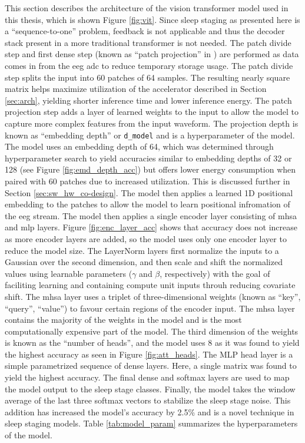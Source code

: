 This section describes the architecture of the vision transformer model used in this thesis, which is shown Figure \ref{fig:vit}. Since sleep staging as presented
here is a ``sequence-to-one'' problem, feedback is not applicable and thus the decoder stack present in a more traditional transformer is not needed. The patch divide step and
first dense step (known as ``patch projection'' in \cite{dosovitskiy2010image}) are performed as data comes in from the \ac{eeg} \ac{adc} to reduce temporary storage usage. The 
patch divide step splits the input into 60 patches of 64 samples. The resulting nearly square matrix helps maximize utilization of the accelerator described in Section \ref{sec:arch},
yielding shorter inference time and lower inference energy. The patch projection step adds a layer of learned weights to the input to allow the model to capture more complex features
from the input waveform. The projection depth is known as ``embedding depth'' or \texttt{d\_model} and is a hyperparameter of the model. The model uses an embedding depth of 64,
which was determined through hyperparameter search to yield accuracies similar to embedding depths of 32 or 128 (see Figure \ref{fig:emd_depth_acc}) but offers lower energy consumption
when paired with 60 patches due to increased utilization. This is discussed further in Section \ref{sec:sw_hw_co-design}. The model then applies a learned 1D positional embedding to
the patches to allow the model to learn positional infromation of the \ac{eeg} stream. The model then applies a single encoder layer consisting of \ac{mhsa} and \ac{mlp} layers. Figure
\ref{fig:enc_layer_acc} shows that accuracy does not increase as more encoder layers are added, so the model uses only one encoder layer to reduce the model size. The LayerNorm layers
first normalize the inputs to a Gaussian over the second dimension, and then scale and shift the normalized values using learnable parameters ($\gamma$ and $\beta$, respectively) with
the goal of faciliting learning and containing compute unit inputs throuh reducing covariate shift. The \ac{mhsa} layer uses a triplet of three-dimensional weights (known as ``key'', 
``query'', ``value'') to favour certain regions of the encoder input. The \ac{mhsa} layer contains the majority of the weights in the model and is the most computationally expensive
part of the model. The third dimension of the weights is known as the ``number of heads'', and the model uses 8 as it was found to yield the highest accuracy as seen in Figure 
\ref{fig:att_heads}. The MLP head layer is a simple parametrized sequence of dense layers. Here, a single matrix was found to yield the highest accuracy. The final dense and softmax
layers are used to map the model output to the sleep stage classes. Finally, the model takes the window average of the last three softmax vectors to stabilize the sleep stage noise.
This addition has increased the model's accuracy by 2.5\% and is a novel technique in sleep staging models. Table \ref{tab:model_param} summarizes the hyperparameters of the model.

